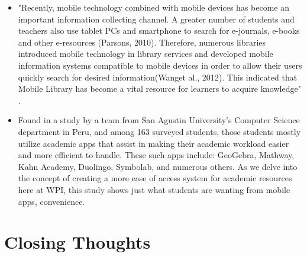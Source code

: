 \begin{itemize}
        \item
        "Recently, mobile technology combined with mobile devices has become an important information collecting channel. A greater number of students and teachers also use tablet PCs and smartphone to search for e-journals, e-books and other e-resources  (Parsons,  2010).  Therefore,  numerous  libraries  introduced  mobile technology in library services and developed mobile information systems compatible to mobile devices in order to allow their users quickly search for desired information(Wanget al., 2012). This indicated that Mobile Library has become a vital resource for learners to acquire knowledge" \cite{pu_chiu_chen_huang_2015}.
        \item
        Found in a study by a team from San Agustin University's Computer Science department in Peru, and among 163 surveyed students, those students mostly utilize academic apps that assist in making their academic workload easier and more efficient to handle. These such apps include: GeoGebra, Mathway, Kahn Academy, Duolingo, Symbolab, and numerous others. As we delve into the concept of creating a more ease of access system for academic resources here at WPI, this study shows just what students are wanting from mobile apps, convenience.\cite {Educational_Apps}
    \end{itemize}
    \section{Closing Thoughts}
    \paragraph{}
    \TODO